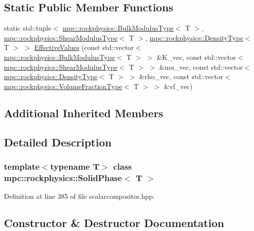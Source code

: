 \subsection*{Static Public Member Functions}
\begin{DoxyCompactItemize}
\item 
static std\+::tuple$<$ \mbox{\hyperlink{structmpc_1_1rockphysics_1_1_bulk_modulus_type}{mpc\+::rockphysics\+::\+Bulk\+Modulus\+Type}}$<$ T $>$, \mbox{\hyperlink{structmpc_1_1rockphysics_1_1_shear_modulus_type}{mpc\+::rockphysics\+::\+Shear\+Modulus\+Type}}$<$ T $>$, \mbox{\hyperlink{structmpc_1_1rockphysics_1_1_density_type}{mpc\+::rockphysics\+::\+Density\+Type}}$<$ T $>$ $>$ \mbox{\hyperlink{classmpc_1_1rockphysics_1_1_solid_phase_ae8dbd8e5777a51515f84f6fb7e87ba97}{Effective\+Values}} (const std\+::vector$<$ \mbox{\hyperlink{structmpc_1_1rockphysics_1_1_bulk_modulus_type}{mpc\+::rockphysics\+::\+Bulk\+Modulus\+Type}}$<$ T $>$ $>$ \&K\+\_\+vec, const std\+::vector$<$ \mbox{\hyperlink{structmpc_1_1rockphysics_1_1_shear_modulus_type}{mpc\+::rockphysics\+::\+Shear\+Modulus\+Type}}$<$ T $>$ $>$ \&mu\+\_\+vec, const std\+::vector$<$ \mbox{\hyperlink{structmpc_1_1rockphysics_1_1_density_type}{mpc\+::rockphysics\+::\+Density\+Type}}$<$ T $>$ $>$ \&rho\+\_\+vec, const std\+::vector$<$ \mbox{\hyperlink{structmpc_1_1rockphysics_1_1_volume_fraction_type}{mpc\+::rockphysics\+::\+Volume\+Fraction\+Type}}$<$ T $>$ $>$ \&vf\+\_\+vec)
\end{DoxyCompactItemize}
\subsection*{Additional Inherited Members}


\subsection{Detailed Description}
\subsubsection*{template$<$typename T$>$\newline
class mpc\+::rockphysics\+::\+Solid\+Phase$<$ T $>$}



Definition at line 385 of file scalarcomposites.\+hpp.



\subsection{Constructor \& Destructor Documentation}
\mbox{\label{classmpc_1_1rockphysics_1_1_solid_phase_ad44503640c956a6c89cb71678dacd6b1}} 
